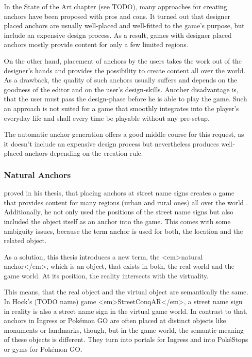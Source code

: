 In the State of the Art chapter (see TODO), many approaches for creating anchors have been proposed with pros and cons. It turned out that designer placed anchors are usually well-placed and well-fitted to the game’s purpose, but include an expensive design process. As a result, games with designer placed anchors mostly provide content for only a few limited regions.

On the other hand, placement of anchors by the users takes the work out of the designer’s hands and provides the possibility to create content all over the world. As a drawback, the quality of such anchors usually suffers and depends on the goodness of the editor and on the user’s design-skills. Another disadvantage is, that the user must pass the design-phase before he is able to play the game. Such an approach is not suited for a game that smoothly integrates into the player’s everyday life and shall every time be playable without any pre-setup.

The automatic anchor generation offers a good middle course for this request, as it doesn’t include an expensive design process but nevertheless produces well-placed anchors depending on the creation rule.

\subsubsection{Natural Anchors}
\citeauthor{hock2014augmented} proved in his thesis, that placing anchors at street name signs creates a game that provides content for many regions (urban and rural ones) all over the world \cite{hock2014augmented}. Additionally, he not only used the positions of the street name signs but also included the object itself as an anchor into the game. This comes with some ambiguity issues, because the term anchor is used for both, the location and the related object.

As a solution, this thesis introduces a new term, the <em>natural anchor</em>, which is an object, that exists in both, the real world and the game world. At its position, the reality intersects with the virtuality.

This means, that the real object and the virtual object are semantically the same. In Hock’s (TODO name) game <em>StreetConqAR</em>, a street name sign in reality is also a street name sign in the virtual game world. In contrast to that, anchors in Ingress or Pokémon GO are often placed at distinct objects like monuments or landmarks, though, but in the game world, the semantic meaning of these objects is different. They turn into portals for Ingress and into PokéStops or gyms for Pokémon GO.

